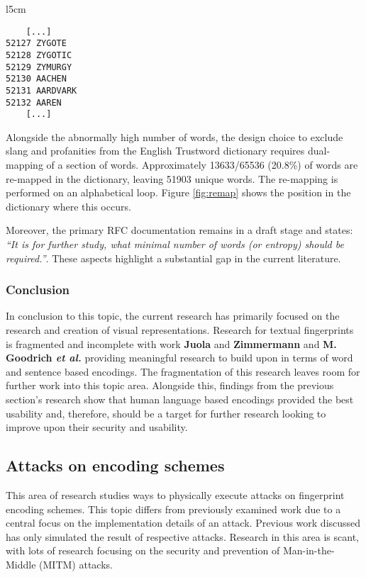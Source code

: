 \begin{wrapfigure}[11]{l}{5cm}
    \centering
    \begin{BVerbatim}
    [...]
52127 ZYGOTE
52128 ZYGOTIC
52129 ZYMURGY
52130 AACHEN
52131 AARDVARK
52132 AAREN
    [...]
    \end{BVerbatim}
    \caption{Re-mapping position}
    \label{fig:remap}
\end{wrapfigure}

Alongside the abnormally high number of words, the design choice to exclude slang and profanities from the English Trustword dictionary requires dual-mapping of a section of words. Approximately 13633/65536 (20.8\%) of words are re-mapped in the dictionary, leaving 51903 unique words. The re-mapping is performed on an alphabetical loop. Figure \ref{fig:remap} shows the position in the dictionary where this occurs.

\newpage

Moreover, the primary RFC documentation remains in a draft stage and states: \textit{``It is for further study, what minimal number of words (or entropy) should be required.''}. These aspects highlight a substantial gap in the current literature.

\subsubsection*{Conclusion}

In conclusion to this topic, the current research has primarily focused on the research and creation of visual representations. Research for textual fingerprints is fragmented and incomplete with work \textbf{Juola} and \textbf{Zimmermann} 
\cite{juola1996whole} and \textbf{M. Goodrich \textit{et al.}}\cite{goodrich2006loud} providing meaningful research to build upon in terms of word and sentence based encodings. The fragmentation of this research leaves room for further work into this topic area. Alongside this, findings from the previous section's research show that human language based encodings provided the best usability and, therefore, should be a target for further research looking to improve upon their security and usability.

\subsection{Attacks on encoding schemes}
This area of research studies ways to physically execute attacks on fingerprint encoding schemes. This topic differs from previously examined work due to a central focus on the implementation details of an attack. Previous work discussed has only simulated the result of respective attacks. Research in this area is scant, with lots of research focusing on the security and prevention of Man-in-the-Middle (MITM) attacks.

